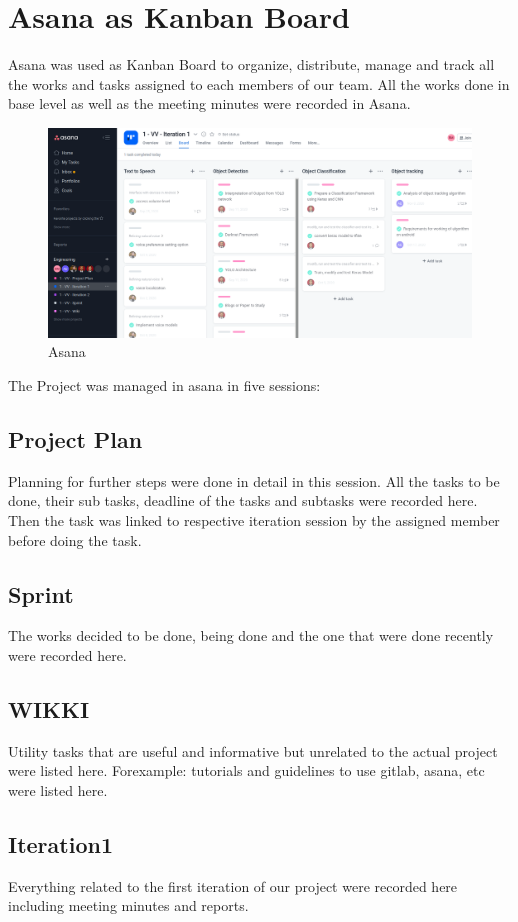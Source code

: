 	\section{Asana as Kanban Board}
	Asana was used as Kanban Board to organize, distribute, manage and track all the works and tasks assigned to each members of our team. All the works done in base level as well as the meeting minutes were recorded in Asana.\\
	\begin{figure}[h]
		\centering
			\includegraphics[width=1\textwidth]{img/asana.png}
			\caption{Asana}    
	\end{figure}
	The Project was managed in asana in five sessions:
		\subsection{Project Plan}
			Planning for further steps were done in detail in this session. All the tasks to be done, their sub tasks, deadline of the tasks and subtasks were recorded here. Then the task was linked to respective iteration session by the assigned member before doing the task.
		\subsection{Sprint}
			The works decided to be done, being done and the one that were done recently were recorded here.
		\subsection{WIKKI}
			Utility tasks that are useful and informative but unrelated to the actual project were listed here. Forexample: tutorials and guidelines to use gitlab, asana, etc were listed here.
		\subsection{Iteration1}
			Everything related to the first iteration of our project were recorded here including meeting minutes and reports.
